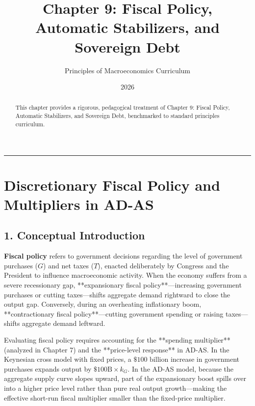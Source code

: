 \documentclass[11pt,letterpaper]{article}
\begin{document}
\title{\Huge\bfseries\color{SlateBlue} Chapter 9: Fiscal Policy, Automatic Stabilizers, and Sovereign Debt}
\author{\large Principles of Macroeconomics Curriculum}
\date{2026}
\maketitle

\thispagestyle{plain}

\begin{abstract}
This chapter provides a rigorous, pedagogical treatment of Chapter 9: Fiscal Policy, Automatic Stabilizers, and Sovereign Debt, benchmarked to standard principles curriculum.
\end{abstract}

\tableofcontents
\vspace{1.5em}
\hrule
\vspace{1.5em}

\section{Discretionary Fiscal Policy and Multipliers in AD-AS}

\subsection*{1. Conceptual Introduction}
\textbf{Fiscal policy} refers to government decisions regarding the level of government purchases ($G$) and net taxes ($T$), enacted deliberately by Congress and the President to influence macroeconomic activity. When the economy suffers from a severe recessionary gap, **expansionary fiscal policy**—increasing government purchases or cutting taxes—shifts aggregate demand rightward to close the output gap. Conversely, during an overheating inflationary boom, **contractionary fiscal policy**—cutting government spending or raising taxes—shifts aggregate demand leftward.

Evaluating fiscal policy requires accounting for the **spending multiplier** (analyzed in Chapter 7) and the **price-level response** in AD-AS. In the Keynesian cross model with fixed prices, a $\$100\text{ billion}$ increase in government purchases expands output by $\$100\text{B} \times k_G$. In the AD-AS model, because the aggregate supply curve slopes upward, part of the expansionary boost spills over into a higher price level rather than pure real output growth—making the effective short-run fiscal multiplier smaller than the fixed-price multiplier.
\end{document}
